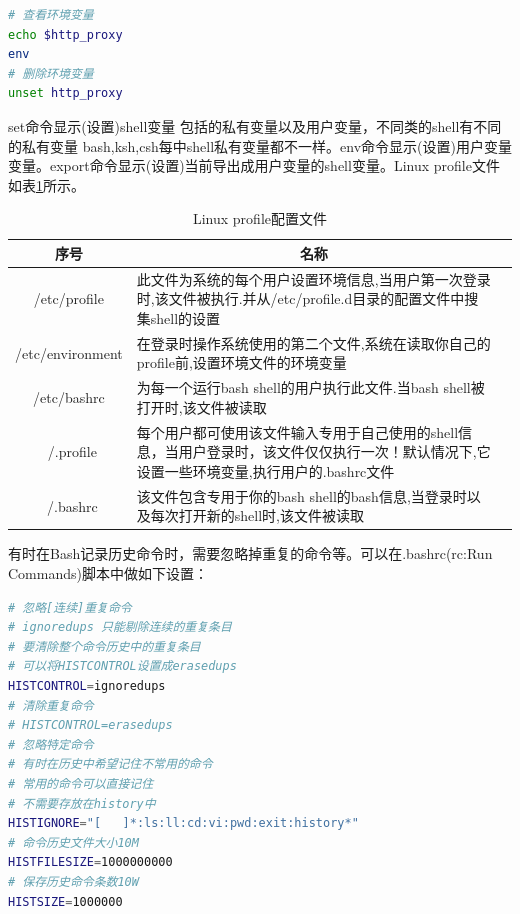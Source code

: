 \documentclass[12pt]{book}
\numberwithin{dummy}{section}
\theoremstyle{ocrenumbox}
\theoremstyle{blacknumex}
\theoremstyle{blacknumbox}
\theoremstyle{ocrenum}
\begin{document}
\begin{lstlisting}[language=Bash]
# 查看环境变量
echo $http_proxy
env
# 删除环境变量
unset http_proxy
\end{lstlisting}

set命令显示(设置)shell变量 包括的私有变量以及用户变量，不同类的shell有不同的私有变量 bash,ksh,csh每中shell私有变量都不一样。env命令显示(设置)用户变量变量。export命令显示(设置)当前导出成用户变量的shell变量。Linux profile文件如表\ref{table:linuxconfigfile}所示。

\begin{table}
	\caption{Linux profile配置文件}
	\label{table:linuxconfigfile}
	\begin{center}
	\begin{tabular}{cp{10cm}c}
		\hline
		\multirow{1}{*}{序号}
		& \multicolumn{1}{c}{名称}  \\
		\hline			
		/etc/profile  & 此文件为系统的每个用户设置环境信息,当用户第一次登录时,该文件被执行.并从/etc/profile.d目录的配置文件中搜集shell的设置 \\
		\hline	
		/etc/environment & 在登录时操作系统使用的第二个文件,系统在读取你自己的profile前,设置环境文件的环境变量 \\
		\hline
		/etc/bashrc & 为每一个运行bash shell的用户执行此文件.当bash shell被打开时,该文件被读取\\
		\hline
		~/.profile & 每个用户都可使用该文件输入专用于自己使用的shell信息，当用户登录时，该文件仅仅执行一次！默认情况下,它设置一些环境变量,执行用户的.bashrc文件\\
		\hline
		~/.bashrc &  该文件包含专用于你的bash shell的bash信息,当登录时以及每次打开新的shell时,该文件被读取\\
		\hline
	\end{tabular}	
	\end{center}
\end{table}

有时在Bash记录历史命令时，需要忽略掉重复的命令等。可以在.bashrc(rc:Run Commands)脚本中做如下设置：

\begin{lstlisting}[language=Bash]
# 忽略[连续]重复命令
# ignoredups 只能剔除连续的重复条目
# 要清除整个命令历史中的重复条目
# 可以将HISTCONTROL设置成erasedups
HISTCONTROL=ignoredups
# 清除重复命令
# HISTCONTROL=erasedups
# 忽略特定命令
# 有时在历史中希望记住不常用的命令
# 常用的命令可以直接记住
# 不需要存放在history中
HISTIGNORE="[   ]*:ls:ll:cd:vi:pwd:exit:history*"
# 命令历史文件大小10M
HISTFILESIZE=1000000000
# 保存历史命令条数10W
HISTSIZE=1000000
\end{lstlisting}
\end{document}
